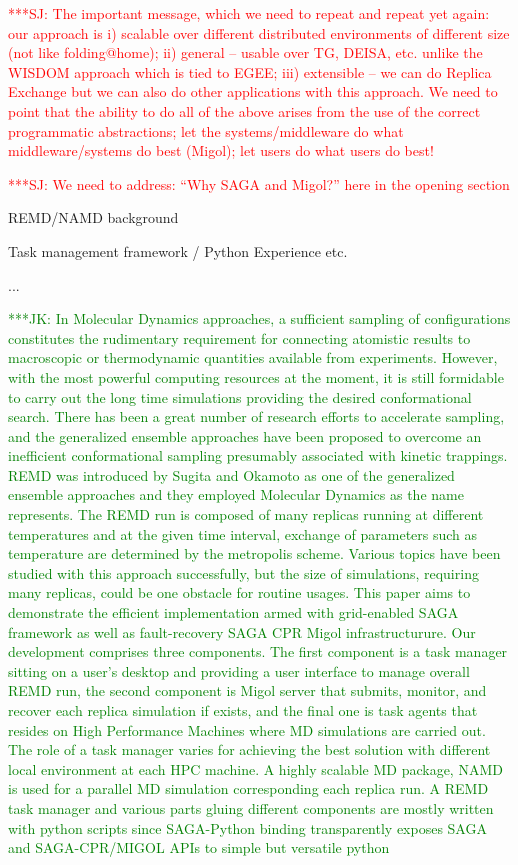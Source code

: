 \documentclass[times, 10pt,twocolumn]{article}
\newcommand{\kimnote}[1]{ {\textcolor{green} { ***JK: #1 }}}
\newcommand{\jhanote}[1]{ {\textcolor{red} { ***SJ: #1 }}}
\begin{document}
\jhanote{The important message, which we need to repeat and repeat yet
  again: our approach is i) scalable over different distributed
  environments of different size (not like folding@home); ii) general
  -- usable over TG, DEISA, etc. unlike the WISDOM approach which is
  tied to EGEE; iii) extensible -- we can do Replica Exchange but we
  can also do other applications with this approach. We need to point
  that the ability to do all of the above arises from the use of the
  correct programmatic abstractions; let the systems/middleware do
  what middleware/systems do best (Migol); let users do what users do
  best!}

\jhanote{We need to address: ``Why SAGA and Migol?'' here in the
  opening section}



REMD/NAMD background

Task management framework  / Python Experience etc.

...                                  

\kimnote{In Molecular Dynamics approaches, a sufficient sampling of configurations constitutes the rudimentary requirement for connecting atomistic results to macroscopic or thermodynamic quantities available from experiments.   However,  with the most powerful computing resources at the moment, it is still formidable to carry out the long time simulations providing the desired conformational search.   There has been a great number of research efforts to accelerate sampling, and the generalized ensemble approaches have been proposed to overcome an inefficient conformational sampling presumably associated with kinetic trappings.  REMD was introduced by Sugita and Okamoto as one of the generalized ensemble approaches and they employed Molecular Dynamics as the name represents.  The REMD run is composed of many replicas running at different temperatures and at the given time interval, exchange of parameters such as temperature are determined by the metropolis scheme.  Various topics have been studied with this approach successfully, but the size of simulations, requiring many replicas, could be one obstacle for routine usages.  This paper aims to demonstrate the efficient implementation armed with grid-enabled SAGA framework as well as fault-recovery SAGA CPR Migol infrastructurure.  Our development comprises three components.  The first component is a task manager sitting on a user's desktop and providing a user interface to manage overall REMD run, the second component is Migol server that submits, monitor, and recover each replica simulation if exists, and the final one is task agents that resides on High Performance Machines where MD simulations are carried out.  The role of a task manager varies for achieving the best solution with different local environment at each HPC machine.  A highly scalable MD package, NAMD is used for a parallel MD simulation corresponding each replica run.  A REMD task manager and various parts gluing different components are mostly written with python scripts since SAGA-Python binding transparently exposes SAGA and SAGA-CPR/MIGOL APIs to simple but versatile python} 
\end{document}
